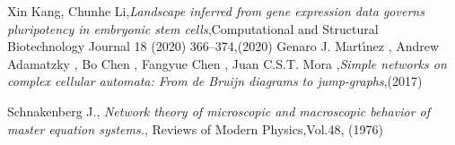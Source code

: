 \begin{thebibliography}{90}
 Xin Kang, Chunhe Li,\emph{Landscape inferred from gene expression data governs pluripotency in
embryonic stem cells},Computational and Structural Biotechnology Journal 18 (2020) 366–374,(2020)
 Genaro J. Martı́nez , Andrew Adamatzky  ,
Bo Chen , Fangyue Chen , Juan C.S.T. Mora ,\emph{Simple networks on complex cellular automata:
From de Bruijn diagrams to jump-graphs},(2017)



 Schnakenberg J., \emph{Network theory of microscopic and macroscopic behavior of master equation systems.}, Reviews of Modern Physics,Vol.48, (1976)



\end{thebibliography}
\clearpage{\pagestyle{empty}\cleardoublepage}

